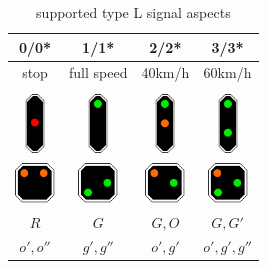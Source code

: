 \documentclass{scrreprt}
\begin{document}
\begin{table}[ht!]
\centering
\begin{tabular}{ |c|c|c|c| }
\hline
\textbf{0}/\textbf{0*} & \textbf{1}/\textbf{1*} & \textbf{2}/\textbf{2*} & \textbf{3}/\textbf{3*} \\\hline
stop & full speed & 40km/h & 60km/h \\\hline 
 & & & \\
\includegraphics[width=20px]{signal/0} &
\includegraphics[width=20px]{signal/1} &
\includegraphics[width=20px]{signal/2} &
\includegraphics[width=20px]{signal/3} \\
\includegraphics[width=40px]{signal/0s} &
\includegraphics[width=40px]{signal/1s} &
\includegraphics[width=40px]{signal/2s} &
\includegraphics[width=40px]{signal/3s} \\\hline

$R$ & $G$ & $G,O$ & $G,G'$ \\
$o',o''$ & $g',g''$ & $ o',g'$ & $o',g',g''$ \\\hline

\end{tabular}
\caption{supported type L signal aspects}
\end{table}
\end{document}
